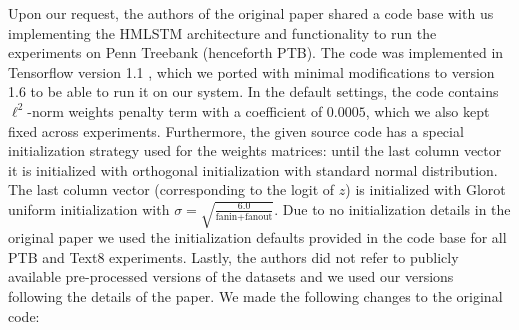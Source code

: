 Upon our request, the authors of the original paper shared a code base with us implementing the HMLSTM architecture and functionality to run the experiments on Penn Treebank (henceforth PTB). The code was implemented in Tensorflow version 1.1 \citep{abadi2016tensorflow}, which we ported with minimal modifications to version 1.6 to be able to run it on our system. In the default settings, the code contains $\ell^2$-norm  weights penalty term with a coefficient of $0.0005$, which we also kept fixed across experiments. Furthermore, the given source code has a special initialization strategy used for the weights matrices: until the last column vector it is initialized with orthogonal initialization with standard normal distribution. The last column vector (corresponding to the logit of $z$) is initialized with Glorot uniform initialization with $\sigma = \sqrt{\frac{6.0}{\text{fanin} + \text{fanout}}}$. Due to no initialization details in the original paper we used the initialization defaults provided in the code base for all PTB and Text8 experiments. Lastly, the authors did not refer to publicly available pre-processed versions of the datasets and we used our versions following the details of the paper. We made the following changes to the original code:
